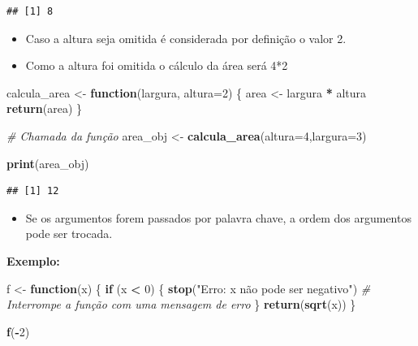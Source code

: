 \documentclass[
]{book}
\newenvironment{Shaded}{\begin{snugshade}}{\end{snugshade}}
\newcommand{\AttributeTok}[1]{\textcolor[rgb]{0.13,0.29,0.53}{#1}}
\newcommand{\CommentTok}[1]{\textcolor[rgb]{0.56,0.35,0.01}{\textit{#1}}}
\newcommand{\ControlFlowTok}[1]{\textcolor[rgb]{0.13,0.29,0.53}{\textbf{#1}}}
\newcommand{\DecValTok}[1]{\textcolor[rgb]{0.00,0.00,0.81}{#1}}
\newcommand{\FunctionTok}[1]{\textcolor[rgb]{0.13,0.29,0.53}{\textbf{#1}}}
\newcommand{\NormalTok}[1]{#1}
\newcommand{\OtherTok}[1]{\textcolor[rgb]{0.56,0.35,0.01}{#1}}
\newcommand{\SpecialCharTok}[1]{\textcolor[rgb]{0.81,0.36,0.00}{\textbf{#1}}}
\newcommand{\StringTok}[1]{\textcolor[rgb]{0.31,0.60,0.02}{#1}}
\providecommand{\tightlist}{%
  \setlength{\itemsep}{0pt}\setlength{\parskip}{0pt}}
\begin{document}
\begin{verbatim}
## [1] 8
\end{verbatim}

\begin{itemize}
\item
  Caso a altura seja omitida é considerada por definição o valor 2.
\item
  Como a altura foi omitida o cálculo da área será 4*2
\end{itemize}

\begin{Shaded}
\begin{Highlighting}[]
\NormalTok{calcula\_area }\OtherTok{\textless{}{-}} \ControlFlowTok{function}\NormalTok{(largura, }\AttributeTok{altura=}\DecValTok{2}\NormalTok{) \{ }
\NormalTok{        area }\OtherTok{\textless{}{-}}\NormalTok{ largura }\SpecialCharTok{*}\NormalTok{ altura  }
        \FunctionTok{return}\NormalTok{(area)}
\NormalTok{\}}

\CommentTok{\# Chamada da função}
\NormalTok{area\_obj }\OtherTok{\textless{}{-}} \FunctionTok{calcula\_area}\NormalTok{(}\AttributeTok{altura=}\DecValTok{4}\NormalTok{,}\AttributeTok{largura=}\DecValTok{3}\NormalTok{) }
    
\FunctionTok{print}\NormalTok{(area\_obj)}
\end{Highlighting}
\end{Shaded}

\begin{verbatim}
## [1] 12
\end{verbatim}

\begin{itemize}
\tightlist
\item
  Se os argumentos forem passados por palavra chave, a ordem dos argumentos pode ser trocada.
\end{itemize}

\textbf{Exemplo:}

\begin{Shaded}
\begin{Highlighting}[]
\NormalTok{f }\OtherTok{\textless{}{-}} \ControlFlowTok{function}\NormalTok{(x) \{}
  \ControlFlowTok{if}\NormalTok{ (x }\SpecialCharTok{\textless{}} \DecValTok{0}\NormalTok{) \{}
    \FunctionTok{stop}\NormalTok{(}\StringTok{"Erro: x não pode ser negativo"}\NormalTok{)  }\CommentTok{\# Interrompe a função com uma mensagem de erro}
\NormalTok{  \}}
  \FunctionTok{return}\NormalTok{(}\FunctionTok{sqrt}\NormalTok{(x))}
\NormalTok{\}}

\FunctionTok{f}\NormalTok{(}\SpecialCharTok{{-}}\DecValTok{2}\NormalTok{)}
\end{Highlighting}
\end{Shaded}
\end{document}
